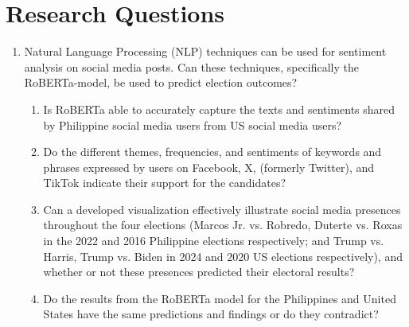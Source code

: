 \section{Research Questions}

\begin{enumerate}
    \item Natural Language Processing (NLP) techniques can be used for sentiment analysis on social media posts. Can these techniques, specifically the RoBERTa-model, be used to predict election outcomes?
    \begin{enumerate}
        \item Is RoBERTa able to accurately capture the texts and sentiments shared by Philippine social media users from US social media users?
        \item Do the different themes, frequencies, and sentiments of keywords and phrases expressed by users on Facebook, X, (formerly Twitter), and TikTok indicate their support for the candidates?
        \item Can a developed visualization effectively illustrate social media presences throughout the four elections (Marcos Jr. vs. Robredo, Duterte vs. Roxas in the 2022 and 2016 Philippine elections respectively; and Trump vs. Harris, Trump vs. Biden in 2024 and 2020 US elections respectively), and whether or not these presences predicted their electoral results?
        \item Do the results from the RoBERTa model for the Philippines and United States have the same predictions and findings or do they contradict?
    \end{enumerate}
\end{enumerate}